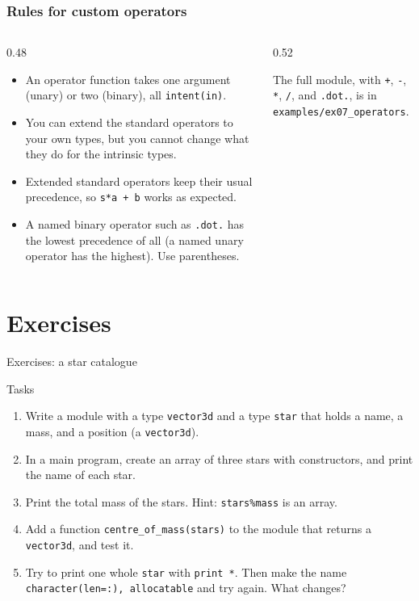 \begin{frame}[fragile]
  \frametitle{Rules for custom operators}
  \begin{columns}[T]
    \begin{column}{0.48\textwidth}
      \begin{itemize}
        \item An operator function takes one argument (unary) or two (binary), all \texttt{intent(in)}.
        \item You can extend the standard operators to your own types, but you cannot change what they do for the intrinsic types.
        \item Extended standard operators keep their usual precedence, so \texttt{s*a + b} works as expected.
        \item A named binary operator such as \texttt{.dot.} has the lowest precedence of all (a named unary operator has the highest). Use parentheses.
      \end{itemize}
    \end{column}

    \begin{column}{0.52\textwidth}
      
      The full module, with \texttt{+}, \texttt{-}, \texttt{*}, \texttt{/}, and \texttt{.dot.}, is in \texttt{examples/ex07\_operators}.
    \end{column}
  \end{columns}
\end{frame}


\section{Exercises}

\begin{frame}{Exercises: a star catalogue}
  \begin{block}{Tasks}
    \begin{enumerate}
      \item Write a module with a type \texttt{vector3d} and a type \texttt{star} that holds a name, a mass, and a position (a \texttt{vector3d}).
      \item In a main program, create an array of three stars with constructors, and print the name of each star.
      \item Print the total mass of the stars. Hint: \texttt{stars\%mass} is an array.
      \item Add a function \texttt{centre\_of\_mass(stars)} to the module that returns a \texttt{vector3d}, and test it.
      \item Try to print one whole \texttt{star} with \texttt{print *}. Then make the name \texttt{character(len=:), allocatable} and try again. What changes?
    \end{enumerate}
  \end{block}
\end{frame}


